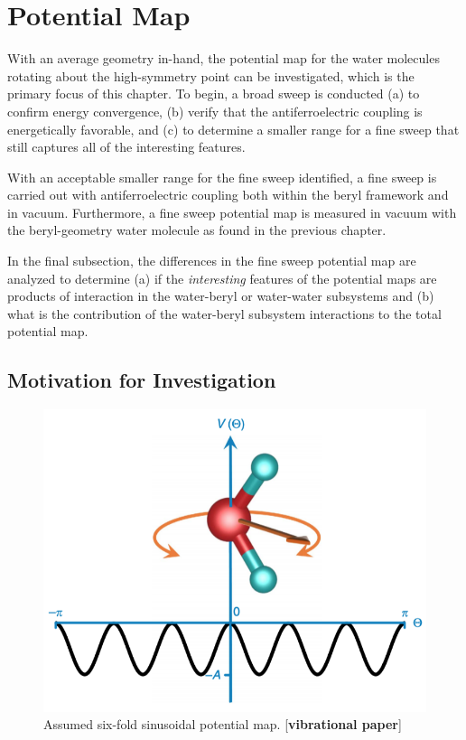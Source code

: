 \chapter{Potential Map}
\label{ch:pot_map}

With an average geometry in-hand, the potential map for the water molecules rotating about the high-symmetry point can be investigated, which is the primary focus of this chapter. To begin, a broad sweep is conducted (a) to confirm energy convergence, (b) verify that the antiferroelectric coupling is energetically favorable, and (c) to determine a smaller range for a fine sweep that still captures all of the interesting features. 

With an acceptable smaller range for the fine sweep identified, a fine sweep is carried out with antiferroelectric coupling both within the beryl framework and in vacuum. Furthermore, a fine sweep potential map is measured in vacuum with the beryl-geometry water molecule  as found in the previous chapter. 

In the final subsection, the differences in the fine sweep potential map are analyzed to determine (a) if the \textit{interesting} features of the potential maps are products of interaction in the water-beryl or water-water subsystems and (b) what is the contribution of the water-beryl subsystem interactions to the total potential map.

    \section{Motivation for Investigation}
    
    \begin{figure}
        \centering
        \includegraphics[width=0.7\linewidth]{Figures/System/pmap_misha.png}
        \caption{Assumed six-fold sinusoidal potential map. [\textbf{vibrational paper}]}
        \label{fig:pmap_misha}
    \end{figure}
    
